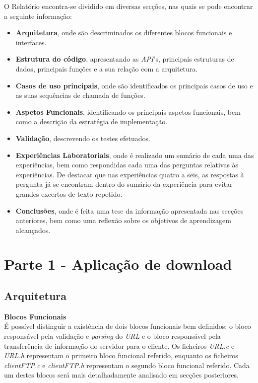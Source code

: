 \documentclass[a4paper, 11pt]{article}
\begin{document}
O Relatório encontra-se dividido em diversas secções, nas quais se pode encontrar a seguinte informação:
\begin{itemize}
	\item \textbf{Arquitetura}, onde são descriminados os diferentes blocos funcionais e interfaces.
	\item \textbf{Estrutura do código}, apresentando as \textit{API}'s, principais estruturas de dados, principais funções e a sua relação com a arquitetura.
	\item \textbf{Casos de uso principais}, onde são identificados os principais casos de uso e as suas sequências de chamada de funções.
	\item \textbf{Aspetos Funcionais}, identificando os principais aspetos funcionais, bem como a descrição da estratégia de implementação.
	\item \textbf{Validação}, descrevendo os testes efetuados.
	\item \textbf{Experiências Laboratoriais}, onde é realizado um sumário de cada uma das experiências, bem como respondidas cada uma das perguntas relativas às experiências. De destacar que nas experiências quatro a seis, as respostas à pergunta já se encontram dentro do sumário da experiência para evitar grandes excertos de texto repetido.
	\item \textbf{Conclusões}, onde é feita uma tese da informação apresentada nas secções anteriores, bem como uma reflexão sobre os objetivos de aprendizagem alcançados.
\end{itemize}

\section{Parte 1 - Aplicação de download}

\subsection{Arquitetura}

\large\textbf{Blocos Funcionais}\\
\normalsize
É possível distinguir a existência de dois blocos funcionais bem definidos: o bloco responsável pela validação e \textit{parsing} do \textit{URL} e o bloco responsável pela transferência de informação do servidor para o cliente. Os ficheiros \textit{URL.c} e \textit{URL.h} representam o primeiro bloco funcional referido, enquanto os ficheiros \textit{clientFTP.c} e \textit{clientFTP.h} representam o segundo bloco funcional referido. Cada um destes blocos será mais detalhadamente analisado em secções posteriores.
\newline
\end{document}
